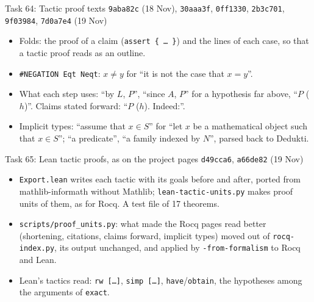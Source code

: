 \documentclass[10pt,aspectratio=169]{beamer}
\newcommand{\bad}[1]{\textcolor{warn}{#1}}
\newcommand{\ok}[1]{\textcolor{good}{#1}}
\newcommand{\commit}[1]{\texttt{\footnotesize #1}}
\begin{document}
\begin{frame}{Task 64: Tactic proof texts}
  \commit{9aba82c} (18 Nov), \commit{30aaa3f}, \commit{0ff1330}, \commit{2b3c701},
  \commit{9f03984}, \commit{7d0a7e4} (19 Nov)
  \begin{itemize}\small
    \item Folds: the proof of a claim (\texttt{assert \{ \ldots\ \}}) and the lines of each case,
          so that a tactic proof reads as an outline.
    \item \texttt{\#NEGATION Eqt Neqt}: \ok{$x \neq y$} for ``it is not the case that $x = y$''.
    \item What each step uses: ``by $L$, $P$'', ``since $A$, $P$'' for a hypothesis far above,
          ``$P$ ($h$)''. Claims stated forward: ``$P$ ($h$). Indeed:''.
    \item Implicit types: ``assume that $x \in S$'' for \bad{``let $x$ be a mathematical object
          such that $x \in S$''}; ``a predicate'', ``a family indexed by $N$'', parsed back to
          Dedukti.
  \end{itemize}
\end{frame}

\begin{frame}{Task 65: Lean tactic proofs, as on the project pages}
  \commit{d49cca6}, \commit{a66de82} (19 Nov)
  \begin{itemize}\small
    \item \texttt{Export.lean} writes each tactic with its goals before and after, ported from
          mathlib-informath without Mathlib; \texttt{lean-tactic-units.py} makes proof units of
          them, as for Rocq. A test file of 17 theorems.
    \item \texttt{scripts/proof\_units.py}: what made the Rocq pages read better (shortening,
          citations, claims forward, implicit types) moved out of \texttt{rocq-index.py},
          \ok{its output unchanged}, and applied by \texttt{-from-formalism} to Rocq and Lean.
    \item Lean's tactics read: \texttt{rw [\ldots]}, \texttt{simp [\ldots]},
          \texttt{have}/\texttt{obtain}, the hypotheses among the arguments of \texttt{exact}.
  \end{itemize}
\end{frame}
\end{document}
